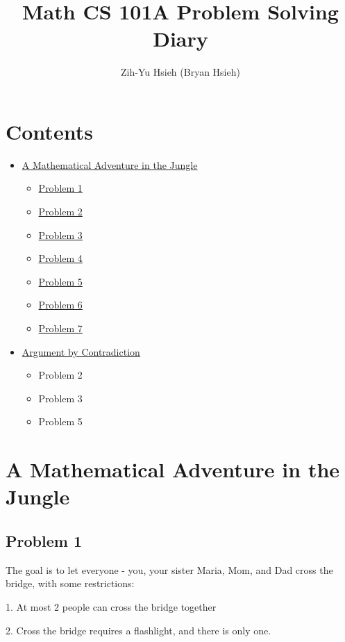 \documentclass{article}
\title{Math CS 101A Problem Solving Diary}
\author{Zih-Yu Hsieh (Bryan Hsieh)}
\begin{document}
\maketitle

\section*{Contents}
\begin{itemize}
    \item \hyperlink{section.1}{A Mathematical Adventure in the Jungle}
    \begin{itemize}
        \item{} \hyperlink{subsection.1.1}{Problem 1}
        \item{} \hyperlink{subsection.1.2}{Problem 2}
        \item{} \hyperlink{subsection.1.3}{Problem 3}
        \item{} \hyperlink{subsection.1.4}{Problem 4}
        \item{} \hyperlink{subsection.1.5}{Problem 5}
        \item{} \hyperlink{subsection.1.6}{Problem 6}
        \item{} \hyperlink{subsection.1.7}{Problem 7}
    \end{itemize}
    \item \hyperlink{section.2}{Argument by Contradiction}
    \begin{itemize}
        \item{} Problem 2
        \item{} Problem 3
        \item{} Problem 5
    \end{itemize}
\end{itemize}

\break

\section{A Mathematical Adventure in the Jungle}
\subsection{Problem 1}
The goal is to let everyone - you, your sister Maria, Mom, and Dad cross the bridge, with some restrictions:

1. At most 2 people can cross the bridge together

2. Cross the bridge requires a flashlight, and there is only one.
\end{document}
